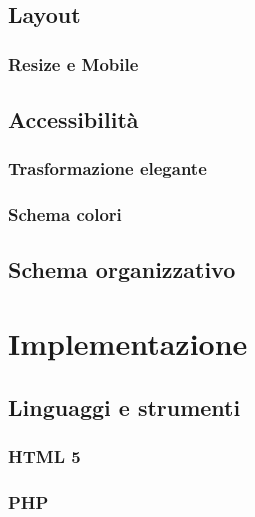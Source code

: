 \documentclass[a4paper]{article}
\begin{document}
		\subsection{Layout}
			
			\subsubsection{Resize e Mobile}
				
		\subsection{Accessibilità}
		 	
		 	\subsubsection{Trasformazione elegante}
		 		
		 	\subsubsection{Schema colori}
		 		
		\subsection{Schema organizzativo}
			

	\newpage

	\section{Implementazione}
		\subsection{Linguaggi e strumenti}
			
			\subsubsection{HTML 5}
				
			\subsubsection{PHP}
				
\end{document}
